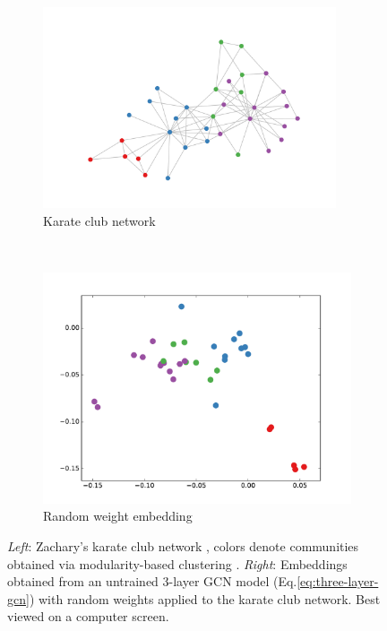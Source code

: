 \documentclass{article} %
\makeatletter
\newcommand*{\eq}{Eq.\@\xspace}
\makeatother
\begin{document}
\begin{figure}[htbp]
\centering
\begin{subfigure}[b]{0.5\textwidth}
    \centering
    \includegraphics[width=0.95\textwidth, trim={5cm 3.2cm 4.9cm 4.4cm}, clip]{karate.pdf}
    \caption{Karate club network}
    \label{fig:karate-club-a}
\end{subfigure}%
~
\begin{subfigure}[b]{0.5\textwidth}
    \centering
    \includegraphics[width=\textwidth, trim={0 1cm 0 0}, clip]{karate_emb.pdf}
    \caption{Random weight embedding}
    \label{fig:karate-club-b}
\end{subfigure}
\caption{\textit{Left}: Zachary's karate club network \citep{zachary1977information}, colors denote communities obtained via modularity-based clustering \citep{brandes2008modularity}. \textit{Right}: Embeddings obtained from an untrained 3-layer GCN model (\eq \ref{eq:three-layer-gcn}) with random weights applied to the karate club network. Best viewed on a computer screen.}
\label{fig:karate-club}
\end{figure}
\end{document}
